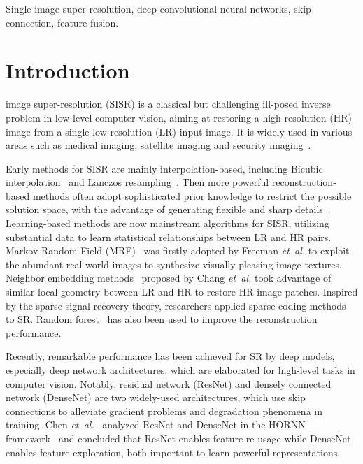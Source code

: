 \documentclass[journal]{IEEEtran}
\begin{document}
\begin{IEEEkeywords}
Single-image super-resolution, deep convolutional neural networks, skip connection, feature fusion.
\end{IEEEkeywords}

\IEEEpeerreviewmaketitle



\section{Introduction}\label{s:s_1}

 image super-resolution (SISR) is a classical but challenging ill-posed inverse problem in low-level computer vision, aiming at restoring a high-resolution (HR) image from a single low-resolution (LR) input image. It is widely used in various areas such as medical imaging, satellite imaging and security imaging~\cite{yang2014single,park2003super}. 

Early methods for SISR are mainly interpolation-based, including Bicubic interpolation~\cite{keys1981cubic} and Lanczos resampling~\cite{duchon1979lanczos}. Then more powerful reconstruction-based methods often adopt sophisticated prior knowledge to restrict the possible solution space, with the advantage of generating flexible and sharp details~\cite{dai2009softcuts,sun2008image,yan2015single,marquina2008image}. Learning-based methods are now mainstream algorithms for SISR, utilizing substantial data to learn statistical relationships between LR and HR pairs. Markov Random Field (MRF)~\cite{freeman2002example} was firstly adopted by 
Freeman \emph{et~al.} to exploit the abundant real-world images to synthesize visually pleasing image textures. Neighbor embedding methods~\cite{chang2004super} proposed by Chang \emph{et~al.} took advantage of similar local geometry between LR and HR to restore HR image patches. Inspired by the sparse signal recovery theory, researchers applied sparse coding methods~\cite{yang2010image,zeyde2010single,timofte2013anchored,timofte2014a+,yang2016consistent} to SR. Random forest~\cite{schulter2015fast} has also been used to improve the reconstruction performance. 

Recently, remarkable performance has been achieved for SR by deep models, especially deep network architectures, which are elaborated for high-level tasks in computer vision. Notably, residual network (ResNet) and densely connected network (DenseNet) are two widely-used architectures, which use skip connections to alleviate gradient problems and degradation phenomena in training. Chen \emph{et~al.}~\cite{chen2017dual} analyzed ResNet and DenseNet in the HORNN framework~\cite{soltani2016higher} and concluded that ResNet enables feature re-usage while DenseNet enables feature exploration, both important to learn powerful representations.
\end{document}
